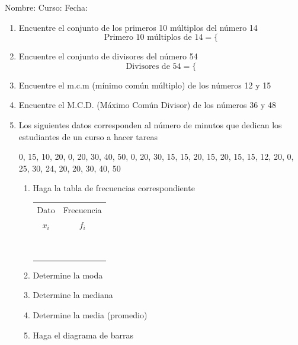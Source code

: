 \documentclass[fleqn]{article}
\newcommand{\LineaNombre}{%
\par
\vspace{\baselineskip}
Nombre:\hrulefill \; Curso: \underline{\hspace*{48pt}} \; Fecha: \underline{\hspace*{2.5cm}} \relax
\par}
\begin{document}
\LineaNombre
\begin{enumerate}
 \item Encuentre el conjunto de los primeros 10 múltiplos del número 14
 \noanswer
 \[\text{Primero 10 múltiplos de }14=\{\]
 \item Encuentre el conjunto de divisores del número 54
 \noanswer
 \[\text{Divisores de }54=\{\]
 \item Encuentre el m.c.m (mínimo común múltiplo) de los números 12 y 15
 \item Encuentre el M.C.D. (Máximo Común Divisor) de los números 36 y 48
 \newpage
 \item Los siguientes datos corresponden al número de minutos que dedican los estudiantes de un curso a hacer tareas
 
 0, 15, 10, 20, 0, 20, 30, 40, 50, 0, 20, 30, 15, 15, 20, 15, 20, 15, 15, 12, 20, 0, 25, 30, 24, 20, 20, 30, 40, 50
 \begin{enumerate}
  \item Haga la tabla de frecuencias correspondiente
  \begin{center}
\begin{tabular}{c|c}\hline
Dato & Frecuencia\\
$x_{i}$ & $f_{i}$\\\hline
 & \\
 & \\
 & \\
 & \\
 & \\
 & \\
 & \\
 & \\
 & 
  \end{tabular}
  \end{center}
  \item Determine la moda
  \item Determine la mediana 
  \item Determine la media (promedio) 
  \item Haga el diagrama de barras\noanswer
 \end{enumerate}
 \end{enumerate}
\end{document}

